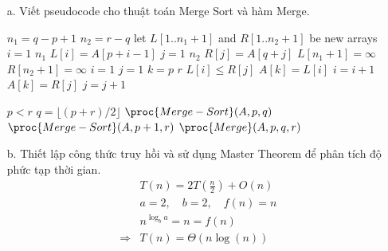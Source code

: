 \documentclass[12pt,a4paper]{article}
\begin{document}
\begin{enumerate}
    \item[a.] Viết pseudocode cho thuật toán Merge Sort và hàm Merge.
    \begin{codebox}
    \li $n_1 = q - p + 1$
    \li $n_2 = r - q$
    \li let $L[1..n_1 + 1]$ and $R[1..n_2 + 1]$ be new arrays
    \li \For $i = 1$ \To $n_1$
        \Do
            \li $L[i] = A[p + i - 1]$
        \End
    \li \For $j = 1$ \To $n_2$
        \Do
            \li $R[j] = A[q + j]$
        \End
    \li $L[n_1 + 1] = \infty$
    \li $R[n_2 + 1] = \infty$
    \li $i = 1$
    \li $j = 1$
    \li \For $k = p$ \To $r$
        \Do
        \li \If $L[i] \le R[j]$
            \Then
                \li $A[k] = L[i]$
                \li $i = i + 1$
        \li \Else $A[k] = R[j]$
                \li $j = j + 1$
            \End
        \End
    \end{codebox}

    \begin{codebox}
        \li \If $p < r$
            \Then
                \li $q = \lfloor (p + r)/2 \rfloor $
                \li $\proc{Merge-Sort}(A, p, q)$
                \li $\proc{Merge-Sort}(A, p + 1, r)$
                \li $\proc{Merge}(A, p, q, r)$
            \End
    \end{codebox}

    \item[b.] Thiết lập công thức truy hồi và sử dụng Master Theorem để phân tích độ phức tạp thời gian.
    \begin{align*}
        &T(n) = 2T(\frac{n}{2}) + O(n) \\
        &a = 2, \quad b = 2, \quad f(n) = n \\ 
        &n^{\log_b a} = n = f(n)   \\
        \Rightarrow &T(n) = \Theta(n \log(n))
    \end{align*}


\end{enumerate}
\end{document}

